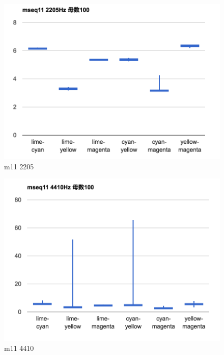 \begin{figure}[p]
  \centering
  \includegraphics[clip,width=1.05\hsize]{img/m11_2205.png}
  \caption{m11 2205}\label{fig:m11Z2205}
\end{figure}

\begin{figure}[p]
  \centering
  \includegraphics[clip,width=1.05\hsize]{img/m11_4410.png}
  \caption{m11 4410}\label{fig:m11Z4410}
\end{figure}

